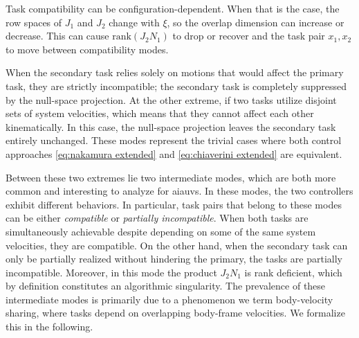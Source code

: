 \documentclass[../main.tex]{subfiles}
\begin{document}
\begin{remark}\label{rem:compat-config}
Task compatibility can be configuration-dependent. When that is the case, the row spaces of \( J_1 \) and \( J_2 \) change with \( \xi \), so the overlap dimension can increase or decrease. This can cause \( \mathrm{rank}(J_2N_1) \) to drop or recover and the task pair \(x_1, x_2\) to move between compatibility modes. %
\end{remark}

When the secondary task relies solely on motions that would affect the primary task, they are strictly incompatible; the secondary task is completely suppressed by the null-space projection. At the other extreme, if two tasks utilize disjoint sets of system velocities, which means that they cannot affect each other kinematically. In this case, the null-space projection leaves the secondary task entirely unchanged. These modes represent the trivial cases where both control approaches \eqref{eq:nakamura extended} and \eqref{eq:chiaverini extended} are equivalent.

Between these two extremes lie two intermediate modes, which are both more common and interesting to analyze for \glspl{aiauv}. In these modes, the two controllers exhibit different behaviors. In particular, task pairs that belong to these modes can be either \emph{compatible} or \emph{partially incompatible}. When both tasks are simultaneously achievable despite depending on some of the same system velocities, they are compatible. On the other hand, when the secondary task can only be partially realized without hindering the primary, the tasks are partially incompatible. Moreover, in this mode the product \( J_2N_1 \) is rank deficient, which by definition constitutes an algorithmic singularity. 
The prevalence of these intermediate modes is primarily due to a phenomenon we term body-velocity sharing, where tasks depend on overlapping body-frame velocities. We formalize this in the following.

\end{document}
